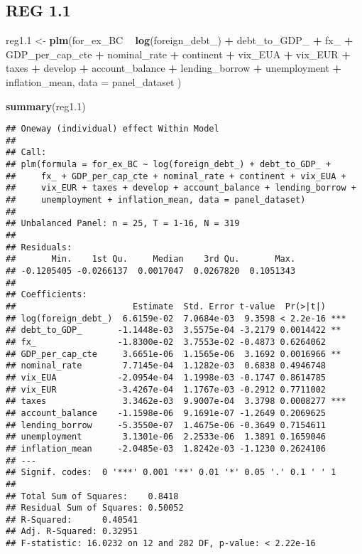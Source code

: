 \documentclass[]{article}
\newenvironment{Shaded}{\begin{snugshade}}{\end{snugshade}}
\newcommand{\KeywordTok}[1]{\textcolor[rgb]{0.13,0.29,0.53}{\textbf{#1}}}
\newcommand{\DataTypeTok}[1]{\textcolor[rgb]{0.13,0.29,0.53}{#1}}
\newcommand{\DecValTok}[1]{\textcolor[rgb]{0.00,0.00,0.81}{#1}}
\newcommand{\StringTok}[1]{\textcolor[rgb]{0.31,0.60,0.02}{#1}}
\newcommand{\OperatorTok}[1]{\textcolor[rgb]{0.81,0.36,0.00}{\textbf{#1}}}
\newcommand{\NormalTok}[1]{#1}
\begin{document}
\subsection{REG 1.1}\label{reg-1.1}

\begin{Shaded}
\begin{Highlighting}[]
\NormalTok{reg1.}\DecValTok{1}\NormalTok{ <-}\StringTok{ }\KeywordTok{plm}\NormalTok{(for_ex_BC }\OperatorTok{~}\StringTok{  }\KeywordTok{log}\NormalTok{(foreign_debt_) }\OperatorTok{+}\StringTok{ }\NormalTok{debt_to_GDP_ }\OperatorTok{+}\StringTok{ }\NormalTok{fx_ }\OperatorTok{+}\StringTok{ }\NormalTok{GDP_per_cap_cte }\OperatorTok{+}\StringTok{ }\NormalTok{nominal_rate }\OperatorTok{+}\StringTok{ }\NormalTok{continent }\OperatorTok{+}\StringTok{ }\NormalTok{vix_EUA }\OperatorTok{+}\StringTok{ }\NormalTok{vix_EUR }\OperatorTok{+}\StringTok{ }\NormalTok{taxes }\OperatorTok{+}\StringTok{ }\NormalTok{develop }\OperatorTok{+}\StringTok{ }\NormalTok{account_balance }\OperatorTok{+}\StringTok{ }\NormalTok{lending_borrow }\OperatorTok{+}\StringTok{ }\NormalTok{unemployment }\OperatorTok{+}\StringTok{ }\NormalTok{inflation_mean, }\DataTypeTok{data =}\NormalTok{ panel_dataset )}

\KeywordTok{summary}\NormalTok{(reg1.}\DecValTok{1}\NormalTok{)}
\end{Highlighting}
\end{Shaded}

\begin{verbatim}
## Oneway (individual) effect Within Model
## 
## Call:
## plm(formula = for_ex_BC ~ log(foreign_debt_) + debt_to_GDP_ + 
##     fx_ + GDP_per_cap_cte + nominal_rate + continent + vix_EUA + 
##     vix_EUR + taxes + develop + account_balance + lending_borrow + 
##     unemployment + inflation_mean, data = panel_dataset)
## 
## Unbalanced Panel: n = 25, T = 1-16, N = 319
## 
## Residuals:
##       Min.    1st Qu.     Median    3rd Qu.       Max. 
## -0.1205405 -0.0266137  0.0017047  0.0267820  0.1051343 
## 
## Coefficients:
##                       Estimate  Std. Error t-value  Pr(>|t|)    
## log(foreign_debt_)  6.6159e-02  7.0684e-03  9.3598 < 2.2e-16 ***
## debt_to_GDP_       -1.1448e-03  3.5575e-04 -3.2179 0.0014422 ** 
## fx_                -1.8300e-02  3.7553e-02 -0.4873 0.6264062    
## GDP_per_cap_cte     3.6651e-06  1.1565e-06  3.1692 0.0016966 ** 
## nominal_rate        7.7145e-04  1.1282e-03  0.6838 0.4946748    
## vix_EUA            -2.0954e-04  1.1998e-03 -0.1747 0.8614785    
## vix_EUR            -3.4267e-04  1.1767e-03 -0.2912 0.7711002    
## taxes               3.3462e-03  9.9007e-04  3.3798 0.0008277 ***
## account_balance    -1.1598e-06  9.1691e-07 -1.2649 0.2069625    
## lending_borrow     -5.3550e-07  1.4675e-06 -0.3649 0.7154611    
## unemployment        3.1301e-06  2.2533e-06  1.3891 0.1659046    
## inflation_mean     -2.0485e-03  1.8242e-03 -1.1230 0.2624106    
## ---
## Signif. codes:  0 '***' 0.001 '**' 0.01 '*' 0.05 '.' 0.1 ' ' 1
## 
## Total Sum of Squares:    0.8418
## Residual Sum of Squares: 0.50052
## R-Squared:      0.40541
## Adj. R-Squared: 0.32951
## F-statistic: 16.0232 on 12 and 282 DF, p-value: < 2.22e-16
\end{verbatim}
\end{document}
